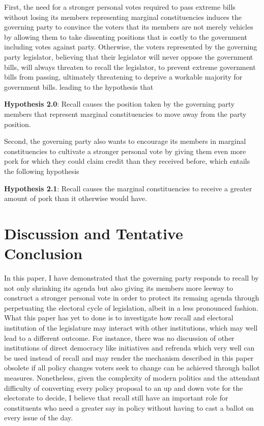 \documentclass{article}
\begin{document}
		First, the need for a stronger personal votes
		required to pass extreme bills
		without losing its members representing marginal constituencies
		induces the governing party
		to convince the voters that its members 
		are not merely vehicles
		by allowing them to take dissenting positions
		that is costly to the government
		including votes against party.
		Otherwise,
		the voters represented by the governing party legislator,
		believing that their legislator will never oppose the government bills,
		will always threaten to recall the legislator,
		to prevent extreme government bills from passing,
		ultimately threatening to deprive a workable majority for government bills.
		leading to the hypothesis that
		
		\textbf{Hypothesis 2.0}:
		Recall causes
		the position taken by the governing party members
		that represent marginal constituencies to move away from the party position. 
		
		
		Second,
		the governing party also wants to encourage
		its members in marginal constituencies to cultivate a stronger personal vote
		by giving them even more pork for which they could claim credit than they received before,
		which entails the following hypothesis
		
		\textbf{Hypothesis 2.1}:
		Recall causes
		the marginal constituencies to receive a greater amount of pork
		than it otherwise would have.
		
		
	\section*{Discussion and Tentative Conclusion}
		In this paper, I have demonstrated that
		the governing party responds to recall by
		not only shrinking its agenda
		but also giving its members more leeway to construct a stronger personal vote
		in order to protect its remaing agenda
		through perpetuating
		the electoral cycle of legislation,
		albeit in a less pronounced fashion.
		What this paper has yet to done
		is to investigate how recall and electoral institution of the legislature
		may interact with other institutions,
		which may well lead to a different outcome.
		For instance,
		there was no discussion of other institutions of direct democracy
		like initiatives and refrenda
		which very well can be used instead of recall
		and may render the mechanism described in this paper obsolete
		if all policy changes voters seek to change can be achieved through ballot measures.
		Nonetheless,
		given the complexity of modern politics
		and the attendant difficulty of converting every policy proposal to
		an up and down vote for the electorate to decide,
		I believe that recall still have an important role for
		constituents who need a greater say in policy
		without having to cast a ballot on every issue of the day.
		
\end{document}
